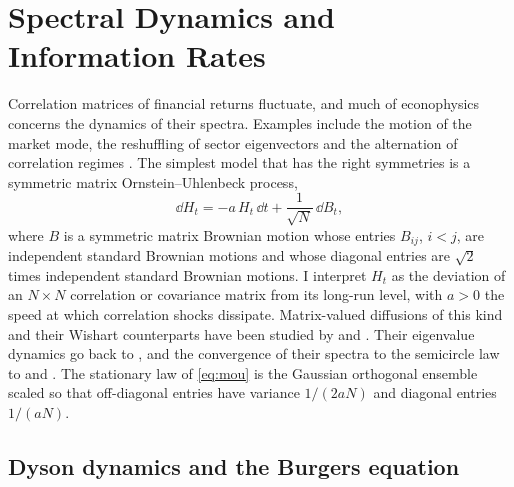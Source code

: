 \section*{Spectral Dynamics and Information Rates}

Correlation matrices of financial returns fluctuate, and much of econophysics concerns the dynamics of their spectra. Examples include the motion of the market mode, the reshuffling of sector eigenvectors and the alternation of correlation regimes \citep{allez2012eigenvector,munnix2012identifying,schmitt2013non,reigneron2011principal}. The simplest model that has the right symmetries is a symmetric matrix Ornstein--Uhlenbeck process,
\begin{equation}
 \dd H_t=-a\,H_t\,\dd t+\frac1{\sqrt N}\,\dd B_t,
 \label{eq:mou}
\end{equation}
where $B$ is a symmetric matrix Brownian motion whose entries $B_{ij}$, $i<j$, are independent standard Brownian motions and whose diagonal entries are $\sqrt2$ times independent standard Brownian motions. I interpret $H_t$ as the deviation of an $N\times N$ correlation or covariance matrix from its long-run level, with $a>0$ the speed at which correlation shocks dissipate. Matrix-valued diffusions of this kind and their Wishart counterparts have been studied by \citet{bru1991wishart} and \citet{gourieroux2009wishart}. Their eigenvalue dynamics go back to \citet{dyson1962brownian}, and the convergence of their spectra to the semicircle law to \citet{chan1992wigner} and \citet{rogers1993interacting}. The stationary law of \eqref{eq:mou} is the Gaussian orthogonal ensemble scaled so that off-diagonal entries have variance $1/(2aN)$ and diagonal entries $1/(aN)$.

\subsection*{Dyson dynamics and the Burgers equation}


